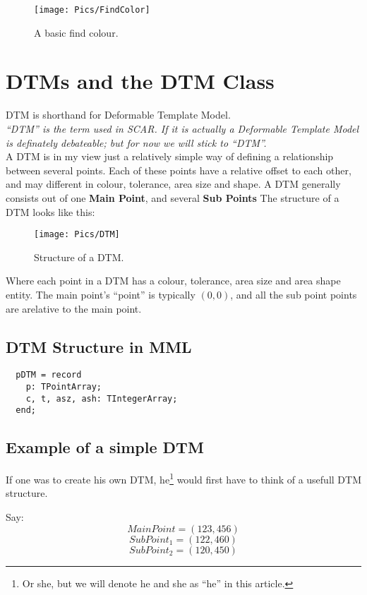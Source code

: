 \documentclass[a4paper, 10pt]{report} %
\begin{document}
\begin{figure}[ht]
    \texttt{[image: Pics/FindColor]}
    \caption{A basic find colour.}
\end{figure}

\section{DTMs and the DTM Class}

DTM is shorthand for Deformable Template Model. \\

\emph{``DTM'' is the term used in SCAR. If it is actually a Deformable Template
Model is definately debateable; but for now we will stick to ``DTM''.} \\

A DTM is in my view just a relatively simple way of defining a relationship
between several points. Each of these points have a relative offset to each
other, and may different in colour, tolerance, area size and shape.
A DTM generally consists out of one \textbf{Main Point}, and several
\textbf{Sub Points}
The structure of a DTM looks like this:

\begin{figure}[ht]
    \texttt{[image: Pics/DTM]}
    \caption{Structure of a DTM.}
\end{figure}

Where each point in a DTM has a colour, tolerance, area size and area shape
entity. The main point's ``point'' is typically $ (0, 0) $, and all the
sub point points are arelative to the main point.

\subsection{DTM Structure in MML}

\begin{verbatim}
  pDTM = record
    p: TPointArray;
    c, t, asz, ash: TIntegerArray;
  end; 
\end{verbatim}

\subsection{Example of a simple DTM}
If one was to create his own DTM, he\footnote{Or she, but we will denote he
and she as ``he'' in this article.} would first have to think of a usefull DTM
structure.

Say:
$$ MainPoint = (123, 456)  $$
$$ SubPoint_1 = (122, 460) $$
$$ SubPoint_2 = (120, 450) $$
\end{document}
